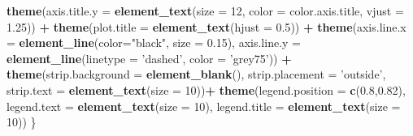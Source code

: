 \documentclass[]{article}
\newenvironment{Shaded}{\begin{snugshade}}{\end{snugshade}}
\newcommand{\KeywordTok}[1]{\textcolor[rgb]{0.13,0.29,0.53}{\textbf{#1}}}
\newcommand{\DataTypeTok}[1]{\textcolor[rgb]{0.13,0.29,0.53}{#1}}
\newcommand{\DecValTok}[1]{\textcolor[rgb]{0.00,0.00,0.81}{#1}}
\newcommand{\FloatTok}[1]{\textcolor[rgb]{0.00,0.00,0.81}{#1}}
\newcommand{\StringTok}[1]{\textcolor[rgb]{0.31,0.60,0.02}{#1}}
\newcommand{\OperatorTok}[1]{\textcolor[rgb]{0.81,0.36,0.00}{\textbf{#1}}}
\newcommand{\NormalTok}[1]{#1}
\begin{document}
\begin{Shaded}
\begin{Highlighting}[]
\StringTok{    }\KeywordTok{theme}\NormalTok{(}\DataTypeTok{axis.title.y =} \KeywordTok{element_text}\NormalTok{(}\DataTypeTok{size =} \DecValTok{12}\NormalTok{, }\DataTypeTok{color =}\NormalTok{ color.axis.title, }\DataTypeTok{vjust =} \FloatTok{1.25}\NormalTok{)) }\OperatorTok{+}
\StringTok{    }\KeywordTok{theme}\NormalTok{(}\DataTypeTok{plot.title =} \KeywordTok{element_text}\NormalTok{(}\DataTypeTok{hjust =} \FloatTok{0.5}\NormalTok{)) }\OperatorTok{+}
\StringTok{    }\KeywordTok{theme}\NormalTok{(}\DataTypeTok{axis.line.x =} \KeywordTok{element_line}\NormalTok{(}\DataTypeTok{color=}\StringTok{"black"}\NormalTok{, }\DataTypeTok{size =} \FloatTok{0.15}\NormalTok{),}
          \DataTypeTok{axis.line.y =} \KeywordTok{element_line}\NormalTok{(}\DataTypeTok{linetype =} \StringTok{'dashed'}\NormalTok{, }\DataTypeTok{color =} \StringTok{'grey75'}\NormalTok{)) }\OperatorTok{+}
\StringTok{    }\KeywordTok{theme}\NormalTok{(}\DataTypeTok{strip.background =} \KeywordTok{element_blank}\NormalTok{(),}
          \DataTypeTok{strip.placement =} \StringTok{'outside'}\NormalTok{,}
          \DataTypeTok{strip.text =} \KeywordTok{element_text}\NormalTok{(}\DataTypeTok{size =} \DecValTok{10}\NormalTok{))}\OperatorTok{+}
\StringTok{    }\KeywordTok{theme}\NormalTok{(}\DataTypeTok{legend.position =} \KeywordTok{c}\NormalTok{(}\FloatTok{0.8}\NormalTok{,}\FloatTok{0.82}\NormalTok{),}
          \DataTypeTok{legend.text =} \KeywordTok{element_text}\NormalTok{(}\DataTypeTok{size =} \DecValTok{10}\NormalTok{),}
          \DataTypeTok{legend.title =} \KeywordTok{element_text}\NormalTok{(}\DataTypeTok{size =} \DecValTok{10}\NormalTok{))}
\NormalTok{\} }


\end{Highlighting}
\end{Shaded}
\end{document}

